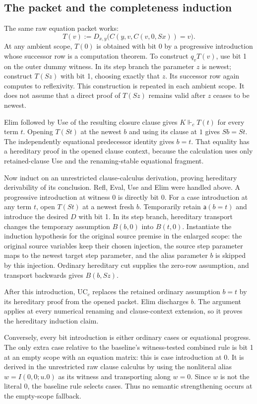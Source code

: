 \subsection{The packet and the completeness induction}

The same raw equation packet works:
\[
 T(v):=D_{x,y}\bigl(C(y,v,C(v,0,Sx))=v\bigr).
\]
At any ambient scope, $T(0)$ is obtained with bit 0 by a
progressive introduction whose successor row is a computation
theorem.  To construct $q_vT(v)$, use bit 1 on the outer dummy
witness.  In its step branch the parameter $z$ is newest; construct
$T(Sz)$ with bit 1, choosing exactly that $z$.  Its successor row
again computes to reflexivity.  This construction is repeated in
each ambient scope.  It does not assume that a direct proof of
$T(Sz)$ remains valid after $z$ ceases to be newest.

Elim followed by Use of the resulting closure clause gives
$K\Vdash_c T(t)$ for every term $t$.  Opening $T(St)$ at the
newest $b$ and using its clause at $1$ gives $Sb=St$.  The
independently equational predecessor identity gives $b=t$.
That equality has a hereditary proof in the opened clause context,
because the calculation uses only retained-clause Use and the
renaming-stable equational fragment.

Now induct on an unrestricted clause-calculus derivation, proving
hereditary derivability of its conclusion.  Refl, Eval, Use and
Elim were handled above.  A progressive introduction at witness
$0$ is directly bit 0.  For a case introduction at any term $t$,
open $T(St)$ at a newest fresh $b$.  Temporarily retain
$\mathsf a(b=t)$ and introduce the desired $D$ with bit 1.
In its step branch, hereditary transport changes the temporary
assumption $B(b,0)$ into $B(t,0)$.  Instantiate the induction
hypothesis for the original source premise in the enlarged scope:
the original source variables keep their chosen injection, the
source step parameter maps to the newest target step parameter,
and the alias parameter $b$ is skipped by this injection.
Ordinary hereditary cut supplies the zero-row assumption, and
transport backwards gives $B(b,Sz)$.

After this introduction, UC$_c$ replaces the retained ordinary
assumption $b=t$ by its hereditary proof from the opened packet.
Elim discharges $b$.  The argument applies at every numerical
renaming and clause-context extension, so it proves the hereditary
induction claim.

Conversely, every bit introduction is either ordinary cases or
equational progress.  The only extra case relative to the
baseline's witness-tested combined rule is bit 1 at an empty
scope with an equation matrix: this is case introduction at $0$.
It is derived in the unrestricted raw clause calculus by using the
nonliteral alias $w=I(0,0;u.0)$ as its witness and transporting
along $w=0$.  Since $w$ is not the literal $0$, the baseline rule
selects cases.  Thus no semantic strengthening occurs at the
empty-scope fallback.

